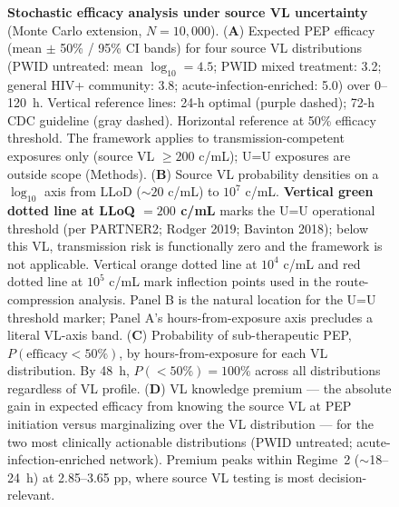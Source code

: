 \documentclass[10pt,letterpaper]{article}
\theoremstyle{definition}
\theoremstyle{remark}
\begin{document}
\begin{figure}[!ht]
\centering

\caption{\textbf{Stochastic efficacy analysis under source VL uncertainty} (Monte Carlo extension, $N = 10{,}000$).
(\textbf{A}) Expected PEP efficacy (mean $\pm$ 50\% / 95\% CI bands) for four source VL distributions (PWID untreated: mean $\log_{10} = 4.5$; PWID mixed treatment: 3.2; general HIV+ community: 3.8; acute-infection-enriched: 5.0) over 0--120~h. Vertical reference lines: 24-h optimal (purple dashed); 72-h CDC guideline (gray dashed). Horizontal reference at 50\% efficacy threshold. The framework applies to transmission-competent exposures only (source VL $\geq 200$ c/mL); U=U exposures are outside scope (Methods).
(\textbf{B}) Source VL probability densities on a $\log_{10}$ axis from LLoD ($\sim 20$ c/mL) to $10^{7}$ c/mL. \textbf{Vertical green dotted line at LLoQ $= 200$ c/mL} marks the U=U operational threshold (per PARTNER2; Rodger 2019; Bavinton 2018); below this VL, transmission risk is functionally zero and the framework is not applicable. Vertical orange dotted line at $10^{4}$ c/mL and red dotted line at $10^{5}$ c/mL mark inflection points used in the route-compression analysis. Panel B is the natural location for the U=U threshold marker; Panel A's hours-from-exposure axis precludes a literal VL-axis band.
(\textbf{C}) Probability of sub-therapeutic PEP, $P(\text{efficacy} < 50\%)$, by hours-from-exposure for each VL distribution. By 48~h, $P(<50\%) = 100\%$ across all distributions regardless of VL profile.
(\textbf{D}) VL knowledge premium --- the absolute gain in expected efficacy from knowing the source VL at PEP initiation versus marginalizing over the VL distribution --- for the two most clinically actionable distributions (PWID untreated; acute-infection-enriched network). Premium peaks within Regime~2 ($\sim$18--24~h) at 2.85--3.65 pp, where source VL testing is most decision-relevant.}
\label{fig:stochastic}
\end{figure}
\end{document}
